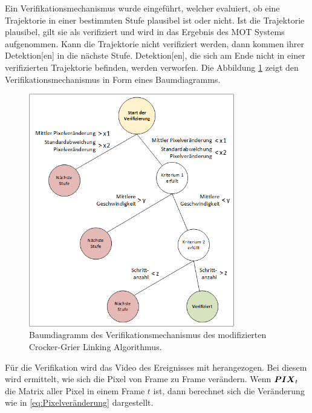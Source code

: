 Ein Verifikationsmechanismus wurde eingeführt, welcher evaluiert, ob eine \gls{Trajektorie} in einer bestimmten Stufe plausibel ist oder nicht. Ist die \gls{Trajektorie} plausibel, gilt sie als verifiziert und wird in das Ergebnis des \gls{MOT} Systems aufgenommen. Kann die \gls{Trajektorie} nicht verifiziert werden, dann kommen ihrer \gls{Detektion}[en] in die nächste Stufe. \gls{Detektion}[en], die sich am Ende nicht in einer verifizierten \gls{Trajektorie} befinden, werden verworfen. Die Abbildung \ref{fig:TreeCrockGrierVerif} zeigt den Verifikationsmechanismus in Form eines Baumdiagramms. 

\begin{figure}[H]
    \centering
    \includegraphics[width=0.8\textwidth]{img/Grafiken/Baumdiagramm Verifizierung der Trajektorien.png}
    \caption[Baumdiagramm der Verifikation des modifizierten Crocker-Grier Algorithmus.]{Baumdiagramm des Verifikationsmechanismus des modifizierten Crocker-Grier Linking Algorithmus.}
    \label{fig:TreeCrockGrierVerif}
\end{figure}

Für die Verifikation wird das Video des Ereignisses mit herangezogen. Bei diesem wird ermittelt, wie sich die Pixel von \gls{Frame} zu \gls{Frame} verändern. Wenn \(\boldsymbol{PIX}_t\) die Matrix aller Pixel in einem \gls{Frame} \(t\) ist, dann berechnet sich die Veränderung wie in \autoref{eq:Pixelveränderung} dargestellt.

